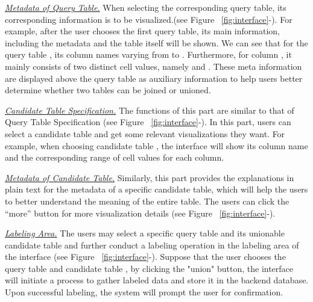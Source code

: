\noindent \underline{\textit{Metadata of Query Table.}}  When selecting the corresponding query table,  its corresponding information is to be visualized.(see Figure ~\ref{fig:interface}-). For example, after the user chooses the first query table, its main information, including the metadata and the table itself  will be shown. We can see that for the query table , its column names varying from  to . Furthermore, for column , it mainly consists of two distinct cell values, namely  and . These meta information are displayed above the query table as auxiliary information to help users better determine whether two tables can be joined or unioned.

\noindent \underline{\textit{Candidate Table Specification.}} The functions of this part are similar to that of Query Table Specification (see Figure ~\ref{fig:interface}-). In this part, users can select a candidate table and get some relevant visualizations they want. For example, when choosing candidate table , the interface will show its column name and the corresponding range of cell values for each column.

\noindent \underline{\textit{Metadata of Candidate Table.}}  Similarly, this part provides the explanations in plain text for the metadata of a specific candidate table, which will help the users to better understand the meaning of the entire table.  The users can click the “more” button for more visualization details (see Figure ~\ref{fig:interface}-).

\noindent \underline{\textit{Labeling Area.}} The users may select a specific query table and its unionable candidate table and further conduct a labeling operation in the labeling area of the interface (see Figure ~\ref{fig:interface}-). Suppose that the user chooses the query table  and candidate table , by clicking the "union" button, the interface will initiate a process to gather labeled data and store it in the backend database. Upon successful labeling, the system will prompt the user for confirmation.


